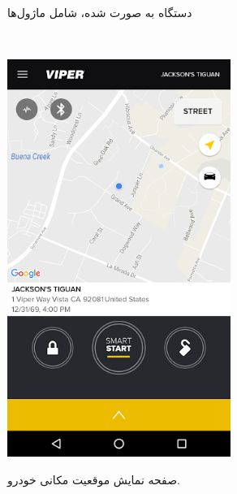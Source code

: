 \documentclass[a4paper,12pt]{report}
\begin{document}
\begin{figure}[!h]
\begin{subfigure}[t]{0.3\linewidth}
			\label{subfig2:fig1:sec3:chap1}
			\caption{
				دستگاه 	به صورت
				شده، شامل ماژول‌ها
			}
		\end{subfigure}
		\\\vspace*{5mm}%
		\begin{subfigure}[t]{0.3\linewidth}
			\centering
			\includegraphics[width=0.8\textwidth]{resources/viper_smart_start_1.jpg}
			\label{subfig3:fig1:sec3:chap1}
			\caption{
				صفحه نمایش موقعیت مکانی خودرو.
			}
		\end{subfigure}
		\hspace*{1cm}
		\begin{subfigure}[t]{0.3\linewidth}
			\centering

\end{subfigure}
\end{figure}
\end{document}
